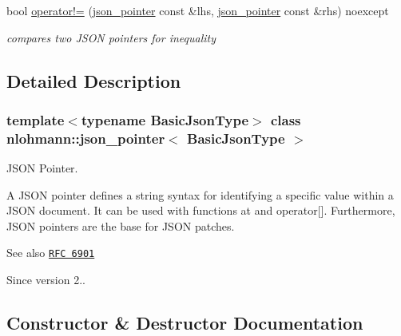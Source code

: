 \begin{DoxyCompactItemize}
bool \hyperlink{classnlohmann_1_1json__pointer_a6779edcf28e6f018a3bbb29c0b4b5e1e}{operator!=} (\hyperlink{classnlohmann_1_1json__pointer}{json\+\_\+pointer} const \&lhs, \hyperlink{classnlohmann_1_1json__pointer}{json\+\_\+pointer} const \&rhs) noexcept
\begin{DoxyCompactList}\small\item\em compares two J\+S\+ON pointers for inequality \end{DoxyCompactList}\end{DoxyCompactItemize}


\subsection{Detailed Description}
\subsubsection*{template$<$typename Basic\+Json\+Type$>$\newline
class nlohmann\+::json\+\_\+pointer$<$ Basic\+Json\+Type $>$}

J\+S\+ON Pointer. 

A J\+S\+ON pointer defines a string syntax for identifying a specific value within a J\+S\+ON document. It can be used with functions {\ttfamily at} and {\ttfamily operator\mbox{[}\mbox{]}}. Furthermore, J\+S\+ON pointers are the base for J\+S\+ON patches.

\begin{DoxySeeAlso}{See also}
\href{https://tools.ietf.org/html/rfc6901}{\tt R\+FC 6901}
\end{DoxySeeAlso}
\begin{DoxySince}{Since}
version 2.. 
\end{DoxySince}


\subsection{Constructor \& Destructor Documentation}
\mbox{\label{classnlohmann_1_1json__pointer_a7f32d7c62841f0c4a6784cf741a6e4f8}} 
